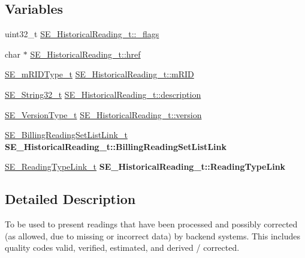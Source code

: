 \subsection*{Variables}
\begin{DoxyCompactItemize}
\item 
uint32\+\_\+t \hyperlink{group__HistoricalReading_gaec60c35670fb8648d5ec83be962f1785}{S\+E\+\_\+\+Historical\+Reading\+\_\+t\+::\+\_\+flags}
\item 
char $\ast$ \hyperlink{group__HistoricalReading_gaff00989792a61ee351a11cb2936a1485}{S\+E\+\_\+\+Historical\+Reading\+\_\+t\+::href}
\item 
\hyperlink{group__mRIDType_gac74622112f3a388a2851b2289963ba5e}{S\+E\+\_\+m\+R\+I\+D\+Type\+\_\+t} \hyperlink{group__HistoricalReading_gaf7799b8df72b4f3d12ea54daed827129}{S\+E\+\_\+\+Historical\+Reading\+\_\+t\+::m\+R\+ID}
\item 
\hyperlink{group__String32_gac9f59b06b168b4d2e0d45ed41699af42}{S\+E\+\_\+\+String32\+\_\+t} \hyperlink{group__HistoricalReading_ga962f40eadac8ad924c5912f1cbacbfc0}{S\+E\+\_\+\+Historical\+Reading\+\_\+t\+::description}
\item 
\hyperlink{group__VersionType_ga4b8d27838226948397ed99f67d46e2ae}{S\+E\+\_\+\+Version\+Type\+\_\+t} \hyperlink{group__HistoricalReading_ga150122578c7309243a68cfc321322f7f}{S\+E\+\_\+\+Historical\+Reading\+\_\+t\+::version}
\item 
\mbox{\label{group__HistoricalReading_gaeaa7c846482e2955c39d1e01c2243062}} 
\hyperlink{structSE__BillingReadingSetListLink__t}{S\+E\+\_\+\+Billing\+Reading\+Set\+List\+Link\+\_\+t} {\bfseries S\+E\+\_\+\+Historical\+Reading\+\_\+t\+::\+Billing\+Reading\+Set\+List\+Link}
\item 
\mbox{\label{group__HistoricalReading_gace46d5c7f161f55dc3238508da3206fe}} 
\hyperlink{structSE__ReadingTypeLink__t}{S\+E\+\_\+\+Reading\+Type\+Link\+\_\+t} {\bfseries S\+E\+\_\+\+Historical\+Reading\+\_\+t\+::\+Reading\+Type\+Link}
\end{DoxyCompactItemize}


\subsection{Detailed Description}
To be used to present readings that have been processed and possibly corrected (as allowed, due to missing or incorrect data) by backend systems. This includes quality codes valid, verified, estimated, and derived / corrected. 

